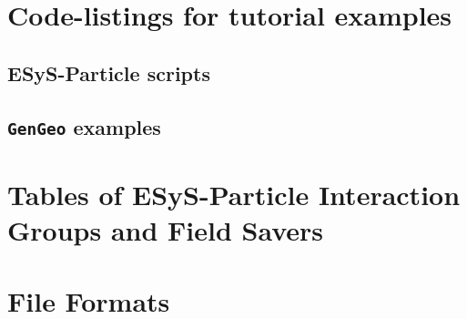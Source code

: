 \documentclass[pdftex,12pt,a4paper,oneside]{book}
\newcommand{\+}{\discretionary{}{}{}}
\begin{document}
\appendix
\chapter{Code-listings for tutorial examples}\label{code}
\section{ESyS-Particle scripts}



















\section{\texttt{GenGeo} examples}\label{sec:geocode}




\chapter[Interaction Groups \& Fields]{Tables of ESyS-Particle Interaction Groups and Field Savers}
\label{tables}


\chapter{File Formats}



%

\end{document}

